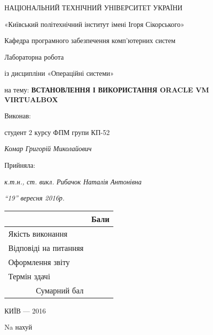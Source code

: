\documentclass[12pt,a4paper]{article}
\begin{document}
\begin{titlepage}
{\centering
	\Large НАЦІОНАЛЬНИЙ ТЕХНІЧНИЙ УНІВЕРСИТЕТ УКРАЇНИ\par
	\large «Київський політехнічний інститут імені Ігоря Сікорського»\par
	\vspace{1cm}
	Кафедра програмного забезпечення комп'ютерних систем\par
	\vspace{1cm}
	\normalsize Лабораторна робота \par
        із дисципліни «Операційні системи»\par
	\vspace{2cm}
	на тему: \textbf{ВСТАНОВЛЕННЯ І ВИКОРИСТАННЯ ORACLE VM VIRTUALBOX}}
	\vspace{1cm}
\begin{flushright}
	Виконав:

	студент 2 курсу ФПМ групи КП-52

	\textit{Комар Григорій Миколайович}
	
	\vspace{1cm}

	Прийняла:

	\textit{к.т.н., ст. викл. Рибачок Наталія Антонівна}

	\textit{“19” вересня 2016р.}

	\vspace{1cm}
	\begin{tabular}{|l|l|}
		\hline
		&Бали\\ \hline
		Якість виконання&\\ \hline
		Відповіді на питанняя&\\ \hline
		Оформлення звіту&\\ \hline
		Термін здачі&\\ \hline
		\multicolumn{1}{|r|}{Сумарний бал}&\\ \hline
	\end{tabular}
\end{flushright}
\vfill
\centering КИЇВ — 2016
\end{titlepage}
Na нахуй
\end{document}
